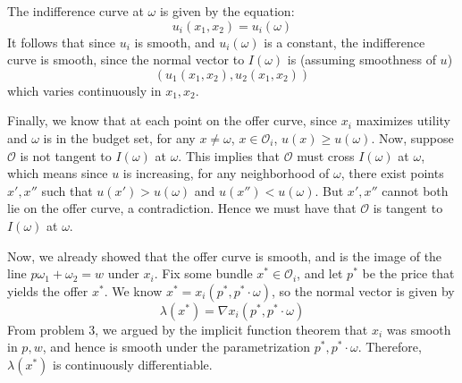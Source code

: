 \documentclass[10pt,letter]{article}
\begin{document}
The indifference curve at $\omega$ is given by the equation:
\[ u_i(x_1, x_2) = u_i(\omega) \]
It follows that since $u_i$ is smooth, and $u_i(\omega)$ is a constant, the indifference curve is smooth, since the normal vector to $I(\omega)$ is (assuming smoothness of $u$)
\[ (u_1(x_1, x_2), u_2(x_1, x_2)) \]
which varies continuously in $x_1, x_2$.

Finally, we know that at each point on the offer curve, since $x_i$ maximizes utility and $\omega$ is in the budget set, for any $x \neq \omega$, $x \in \mathcal{O}_i$, $u(x) \ge u(\omega)$. Now, suppose $\mathcal{O}$ is not tangent to $I(\omega)$ at $\omega$. This implies that $\mathcal{O}$ must cross $I(\omega)$ at $\omega$, which means since $u$ is increasing, for any neighborhood of $\omega$, there exist points $x', x''$ such that $u(x') > u(\omega)$ and $u(x'') < u(\omega)$. But $x', x''$ cannot both lie on the offer curve, a contradiction. Hence we must have that $\mathcal{O}$ is tangent to $I(\omega)$ at $\omega$.

Now, we already showed that the offer curve is smooth, and is the image of the line $p \omega_1 + \omega_2 = w$ under $x_i$. Fix some bundle $x^* \in \mathcal{O}_i$, and let $p^*$ be the price that yields the offer $x^*$. We know $x^* = x_i(p^*, p^*\cdot \omega)$, so the normal vector is given by
\[ \lambda(x^*) = \nabla x_i(p^*, p^* \cdot \omega) \] From problem 3, we argued by the implicit function theorem that $x_i$ was smooth in $p, w$, and hence is smooth under the parametrization $p^*, p^* \cdot \omega$. Therefore,
$ \lambda(x^*) $ is continuously differentiable.
\end{document}
